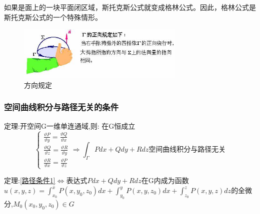 \documentclass[10pt, a4paper, oneside]{ctexart}
\begin{document}
\begin{sloppypar}
	如果是面上的一块平面闭区域，斯托克斯公式就变成格林公式。因此，格林公式是斯托克斯公式的一个特殊情形。

	\begin{figure}[htbp]
		\centering
		\includegraphics[width=8cm]{image006.jpg}
		\caption{方向规定}
	\end{figure}
	\subsubsection{空间曲线积分与路径无关的条件}
	定理:开空间G一维单连通域,则:
	在G恒成立
	\begin{equation}\label{路径条件1}
		\begin{cases}
			\frac{\vartheta P}{\vartheta y} = \frac{\vartheta Q}{\vartheta x} \\
			\frac{\vartheta Q}{\vartheta z} = \frac{\vartheta R}{\vartheta y} \\
			\frac{\vartheta R}{\vartheta x} = \frac{\vartheta P}{\vartheta z}
		\end{cases}\Rightarrow\int_\Gamma Pdx + Qdy + Rdz\text{空间曲线积分与路径无关}
	\end{equation}

	定理:\eqref{路径条件1}$\Leftrightarrow$表达式$Pdx + Qdy + Rdz$在G内成为函数$u(x,y,z)=\int_{x_0}^{x}P(x,y_0, z_0)dx +\int_{y_0}^{y}P(x,y, z_0)dx + \int_{z_0}^{z}P(x,y, z)dz $的全微分,$M_
		0(x_0, y_0, z_0)\in G$

\end{sloppypar}
\end{document}
